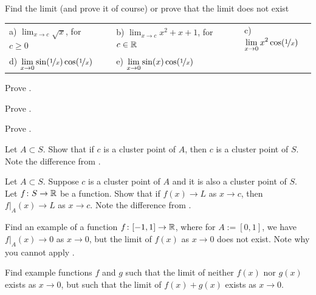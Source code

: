 \begin{exercise}
Find the limit (and prove it of course) or prove that the limit does not exist

\medskip

\noindent
\begin{tabular}{lllll}
a)
$\displaystyle
\lim_{x\to c} \sqrt{x}
$, for $c \geq 0$
& &
b)
$\displaystyle
\lim_{x\to c} x^2+x+1
$, for $c \in {\mathbb{R}}$
& &
c)
$\displaystyle
\lim_{x\to 0} x^2 \cos (\nicefrac{1}{x})
$
\\
d)
$\displaystyle
\lim_{x\to 0} \sin(\nicefrac{1}{x}) \cos (\nicefrac{1}{x})
$
& &
e)
$\displaystyle
\lim_{x\to 0} \sin(x) \cos (\nicefrac{1}{x})
$ & 
\end{tabular}
\end{exercise}

\begin{exercise}
Prove .
\end{exercise}

\begin{exercise}
Prove .
\end{exercise}

\begin{exercise}
Prove .
\end{exercise}

\begin{exercise}
Let $A \subset S$.  Show that if $c$ is a cluster point of $A$, then $c$
is a cluster point of $S$.  Note the difference from
.
\end{exercise}

\begin{exercise} \label{exercise:restrictionlimitexercise}
Let $A \subset S$.  Suppose $c$ is a cluster point of $A$ and
it is also a cluster point of $S$.
Let $f \colon S \to {\mathbb{R}}$ be a function.  Show that if
$f(x) \to L$ as $x \to c$, then
$f|_A(x) \to L$ as $x \to c$.
Note the difference from
.
\end{exercise}

\begin{exercise}
Find an example of a function $f \colon [-1,1] \to {\mathbb{R}}$, where for
$A:=[0,1]$, we have
$f|_A(x) \to 0$ as $x \to 0$, but the limit of $f(x)$ as $x \to 0$
does not exist.  Note why you cannot apply
.
\end{exercise}

\begin{exercise}
Find example functions $f$ and $g$ such that the limit of neither $f(x)$
nor $g(x)$ exists as $x \to 0$, but such that the limit of $f(x)+g(x)$ exists
as $x \to 0$.
\end{exercise}

